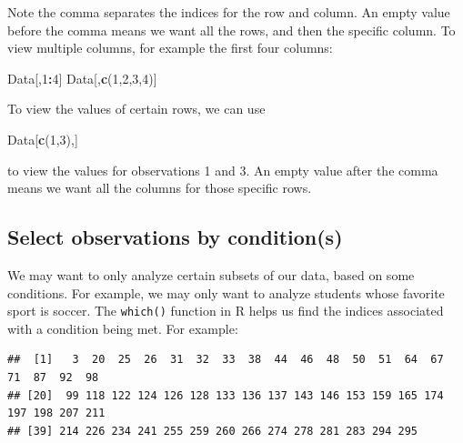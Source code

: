 \documentclass[
]{book}
\newenvironment{Shaded}{\begin{snugshade}}{\end{snugshade}}
\newcommand{\DecValTok}[1]{\textcolor[rgb]{0.00,0.00,0.81}{#1}}
\newcommand{\FunctionTok}[1]{\textcolor[rgb]{0.13,0.29,0.53}{\textbf{#1}}}
\newcommand{\NormalTok}[1]{#1}
\newcommand{\SpecialCharTok}[1]{\textcolor[rgb]{0.81,0.36,0.00}{\textbf{#1}}}
\newcommand{\StringTok}[1]{\textcolor[rgb]{0.31,0.60,0.02}{#1}}
\begin{document}
Note the comma separates the indices for the row and column. An empty value before the comma means we want all the rows, and then the specific column. To view multiple columns, for example the first four columns:

\begin{Shaded}
\begin{Highlighting}[]
\NormalTok{Data[,}\DecValTok{1}\SpecialCharTok{:}\DecValTok{4}\NormalTok{]}
\NormalTok{Data[,}\FunctionTok{c}\NormalTok{(}\DecValTok{1}\NormalTok{,}\DecValTok{2}\NormalTok{,}\DecValTok{3}\NormalTok{,}\DecValTok{4}\NormalTok{)]}
\end{Highlighting}
\end{Shaded}

To view the values of certain rows, we can use

\begin{Shaded}
\begin{Highlighting}[]
\NormalTok{Data[}\FunctionTok{c}\NormalTok{(}\DecValTok{1}\NormalTok{,}\DecValTok{3}\NormalTok{),]}
\end{Highlighting}
\end{Shaded}

to view the values for observations 1 and 3. An empty value after the comma means we want all the columns for those specific rows.

\hypertarget{select-observations-by-conditions}{%
\subsection{Select observations by condition(s)}\label{select-observations-by-conditions}}

We may want to only analyze certain subsets of our data, based on some conditions. For example, we may only want to analyze students whose favorite sport is soccer. The \texttt{which()} function in R helps us find the indices associated with a condition being met. For example:

\begin{Shaded}
\end{Shaded}

\begin{verbatim}
##  [1]   3  20  25  26  31  32  33  38  44  46  48  50  51  64  67  71  87  92  98
## [20]  99 118 122 124 126 128 133 136 137 143 146 153 159 165 174 197 198 207 211
## [39] 214 226 234 241 255 259 260 266 274 278 281 283 294 295
\end{verbatim}
\end{document}
